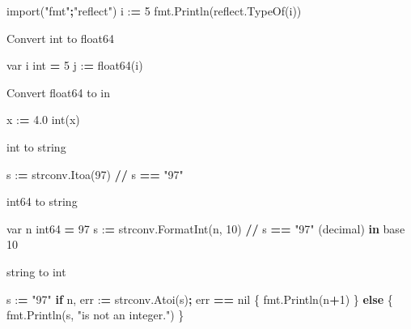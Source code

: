 \documentclass[]{book}
\newenvironment{Shaded}{\begin{snugshade}}{\end{snugshade}}
\newcommand{\KeywordTok}[1]{\textcolor[rgb]{0.13,0.29,0.53}{\textbf{#1}}}
\newcommand{\DecValTok}[1]{\textcolor[rgb]{0.00,0.00,0.81}{#1}}
\newcommand{\FloatTok}[1]{\textcolor[rgb]{0.00,0.00,0.81}{#1}}
\newcommand{\StringTok}[1]{\textcolor[rgb]{0.31,0.60,0.02}{#1}}
\newcommand{\ImportTok}[1]{#1}
\newcommand{\ControlFlowTok}[1]{\textcolor[rgb]{0.13,0.29,0.53}{\textbf{#1}}}
\newcommand{\OperatorTok}[1]{\textcolor[rgb]{0.81,0.36,0.00}{\textbf{#1}}}
\newcommand{\BuiltInTok}[1]{#1}
\newcommand{\NormalTok}[1]{#1}
\begin{document}
\begin{Shaded}
\begin{Highlighting}[]
\ImportTok{import}\NormalTok{(}\StringTok{"fmt"}\OperatorTok{;}\StringTok{"reflect"}\NormalTok{)}
\NormalTok{i :}\OperatorTok{=} \DecValTok{5}
\NormalTok{fmt.Println(reflect.TypeOf(i))}
\end{Highlighting}
\end{Shaded}

Convert int to float64

\begin{Shaded}
\begin{Highlighting}[]
\NormalTok{var i }\BuiltInTok{int} \OperatorTok{=} \DecValTok{5}
\NormalTok{j :}\OperatorTok{=}\NormalTok{ float64(i)}
\end{Highlighting}
\end{Shaded}

Convert float64 to in

\begin{Shaded}
\begin{Highlighting}[]
\NormalTok{x :}\OperatorTok{=} \FloatTok{4.0}
\BuiltInTok{int}\NormalTok{(x)}
\end{Highlighting}
\end{Shaded}

int to string

\begin{Shaded}
\begin{Highlighting}[]
\NormalTok{s :}\OperatorTok{=}\NormalTok{ strconv.Itoa(}\DecValTok{97}\NormalTok{) }\OperatorTok{//}\NormalTok{ s }\OperatorTok{==} \StringTok{"97"}
\end{Highlighting}
\end{Shaded}

int64 to string

\begin{Shaded}
\begin{Highlighting}[]
\NormalTok{var n int64 }\OperatorTok{=} \DecValTok{97}
\NormalTok{s :}\OperatorTok{=}\NormalTok{ strconv.FormatInt(n, }\DecValTok{10}\NormalTok{) }\OperatorTok{//}\NormalTok{ s }\OperatorTok{==} \StringTok{"97"}\NormalTok{ (decimal) }\KeywordTok{in}\NormalTok{ base }\DecValTok{10}
\end{Highlighting}
\end{Shaded}

string to int

\begin{Shaded}
\begin{Highlighting}[]
\NormalTok{s :}\OperatorTok{=} \StringTok{"97"}
\ControlFlowTok{if}\NormalTok{ n, err :}\OperatorTok{=}\NormalTok{ strconv.Atoi(s)}\OperatorTok{;}\NormalTok{ err }\OperatorTok{==}\NormalTok{ nil \{}
\NormalTok{    fmt.Println(n}\OperatorTok{+}\DecValTok{1}\NormalTok{)}
\NormalTok{\} }\ControlFlowTok{else}\NormalTok{ \{}
\NormalTok{    fmt.Println(s, }\StringTok{"is not an integer."}\NormalTok{)}
\NormalTok{\}}
\end{Highlighting}
\end{Shaded}
\end{document}
